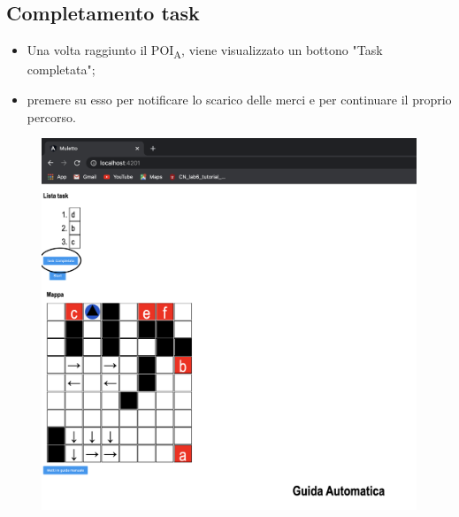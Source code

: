 \subsection{Completamento task}
\begin{itemize}
    \item Una volta raggiunto il POI\textsubscript{A}, viene visualizzato un bottono "Task completata";
    \item premere su esso per notificare lo scarico delle merci e per continuare il proprio percorso.
\end{itemize}
\begin{figure}[H]
    \centering
    \includegraphics[scale=0.4]{res/images/forklift_taskcompletata.png}
\end{figure}
